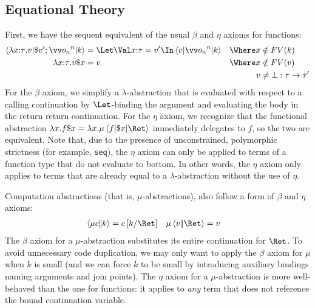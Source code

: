 \documentclass{article}
\begin{document}
\subsection{Equational Theory}

First, we have the sequent equivalent of the usual $\beta$ and $\eta$ axioms for
functions:
\begin{align*}
  \braket{\fn{\ann{x}{\ty}} \tm | \appto{\tm'} \then \vect[n]{\frm_n} | \ko}
  &=
  \Let \nonrec{\bindv{\ann{x}{\ty}}{\tm'}} \In \braket{\tm | \vect[n]{\frm_n} | \ko}
  &
  \Where
  x &\notin FV(\ko)
  \\
  \fn{\ann{x}{\ty}} \tm \appto{x}
  &=
  \tm
  &
  \Where
  x &\notin FV(\tm)
  \\
  &&
  \tm &\neq \bot : \ty \to \ty'
\end{align*}
For the $\beta$ axiom, we simplify a $\lambda$-abstraction that is evaluated
with respect to a calling continuation by $\Let$-binding the argument and
evaluating the body in the return return continuation.  For the $\eta$ axiom, we
recognize that the functional abstraction
$\fn{x}f\appto{x}=\fn{x}\comp{r}\braket{f | \appto{x} | \ret r}$ immediately
delegates to $f$, so the two are equivalent.  Note that, due to the presence of
unconstrained, polymorphic strictness (for example, \texttt{seq}), the $\eta$
axiom can only be applied to terms of a function type that do not evaluate to
bottom.  In other words, the $\eta$ axiom only applies to terms that are already
equal to a $\lambda$-abstraction without the use of $\eta$.

Computation abstractions (that is, $\mu$-abstractions), also follow a form of
$\beta$ and $\eta$ axioms:
\begin{align*}
  \cut{\comp{r}\cmd}{\ko}
  &=
  \cmd\subst{\ret r}{\ko}
  &
  \comp{r}\cut{\tm}{\ret r}
  &=
  \tm
\end{align*}
The $\beta$ axiom for a $\mu$-abstraction substitutes its entire continuation
for $\ret r$.  To avoid unnecessary code duplication, we may only want to apply
the $\beta$ axiom for $\mu$ when $k$ is small (and we can force $k$ to be small
by introducing auxiliary bindings naming arguments and join points).  The $\eta$
axiom for a $\mu$-abstraction is more well-behaved than the one for functions:
it applies to \emph{any} term that does not reference the bound continuation
variable.
\end{document}
